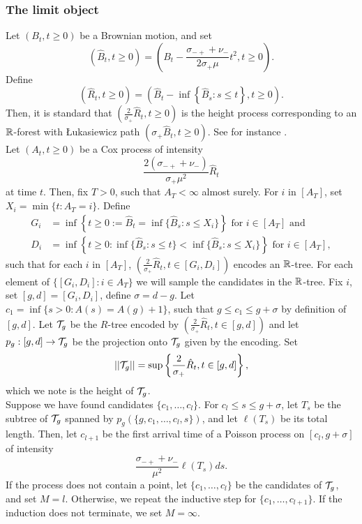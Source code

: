\subsubsection{The limit object}\label{subsubsec.samplecontinuousobject}
Let $(B_t,t\geq 0)$ be a Brownian motion, and set $$\left(\hat{B}_t,t\geq 0\right)=\left(B_t-\frac{\sigma_{-+}+\nu_-}{2\sigma_+\mu}t^2,t\geq 0\right).$$
Define 
$$(\hat{R}_t,t\geq 0)= \left(\hat{B}_t-\inf\left\{\hat{B}_s: s\leq t\right\},t\geq 0\right).$$
Then, it is standard that $\left(\frac{2}{\sigma_+}\hat{R}_t,t\geq 0\right)$ is the height process corresponding to an ${\mathbb R}$-forest with \L ukasiewicz path $\left(\sigma_+\hat{B}_t,t\geq 0\right)$. See for instance \cite{AddarioBerry2010}. \\
Let $(A_t,t\geq 0)$ be a Cox process of intensity $$\frac{2(\sigma_{-+}+\nu_-)}{\sigma_+\mu^2} \hat{R}_t$$ at time $t$. Then, fix $T>0$, such that $A_T<\infty$ almost surely. For $i$ in $\left[A_T\right]$, set $X_i=\min\{t:A_T=i\}$. Define
\begin{align*}
G_i&=\inf\left\{t\geq 0:=\hat{B}_t=\inf\{\hat{B}_s:s\leq X_i\}\right\}\text{ for }i\in \left[A_T\right]\text{ and}\\
D_i&=\inf\left\{ t\geq 0: \inf\{\hat{B}_s:s\leq t\} < \inf\{\hat{B}_s:s\leq X_i\}\right\}\text{ for }i\in \left[A_T\right],
\end{align*}
such that for each $i$ in $\left[A_T\right]$, $\left(\frac{2}{\sigma_+}\hat{R}_t,t\in [G_i,D_i]\right)$ encodes an ${\mathbb R}$-tree. For each element of $\{[G_i,D_i]:i\in A_T\}$ we will sample the candidates in the ${\mathbb R}$-tree. Fix $i$, set $[g,d]=[G_i,D_i]$, define $\sigma=d-g$. Let $c_1=\inf\{s>0:A(s)=A(g)+1\}$, such that $g\leq c_1\leq g+\sigma$ by definition of $[g,d]$. Let ${\mathcal T}_g$ be the $R$-tree encoded by $\left(\frac{2}{\sigma_+}\hat{R}_t,t\in [g,d]\right)$ and let $p_g:[g,d]\to {\mathcal T}_g$ be the projection onto ${\mathcal T}_g$ given by the encoding. Set $$||{\mathcal T}_g||=\sup\left\{\frac{2}{\sigma_+}\hat{R}_t,t\in [g,d]\right\},$$
which we note is the height of ${\mathcal T}_g$. \\
Suppose we have found candidates $\{c_1,\dots,c_l\}$. For $c_l\leq s\leq g+\sigma$, let $T_s$ be the subtree of ${\mathcal T}_g$ spanned by $p_g\left(\{g,c_1,\dots,c_l,s\}\right)$, and let $\ell(T_s)$ be its total length. Then, let $c_{l+1}$ be the first arrival time of a Poisson process on $[c_l,g+\sigma]$ of intensity $$\frac{\sigma_{-+}+\nu_-}{\mu^2}\ell(T_s)ds.$$ If the process does not contain a point, let $\{c_1,\dots,c_l\}$ be the candidates of ${\mathcal T}_g$, and set $M=l$. Otherwise, we repeat the inductive step for $\{c_1,\dots,c_{l+1}\}.$ If the induction does not terminate, we set $M=\infty$.\\
